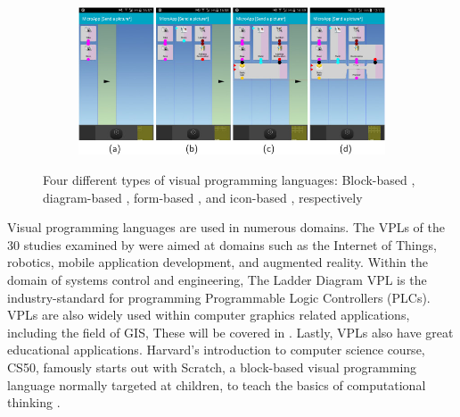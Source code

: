 \begin{figure}
\begin{subfigure}[c]{0.45\linewidth}
  \caption{}\label{fig:vpl-types:3}
\end{subfigure}%
\qquad %
\begin{subfigure}[d]{0.45\linewidth}
  \centering
  \graphicspath{{../../assets/images/background/vpl/}}
  \includegraphics[width=\linewidth]{icon-based.jpg}
  \caption{}\label{fig:vpl-types:4}
\end{subfigure}%
\caption[Types of \ac{vpl}s]{Four different types of visual programming languages: 
Block-based \citep{resnick_scratch_2009}, 
diagram-based \citep{blender_foundation_geometry_2022}, 
form-based \citep{weber_form-based_2013}, 
and icon-based \citep{francese_iconic_2017}, respectively}%
\label{fig:vpl-types}
\end{figure}

Visual programming languages are used in numerous domains. 
The VPLs of the 30 studies examined by \citet{kuhail_characterizing_2021} were aimed at domains such as the Internet of Things, robotics, mobile application development, and augmented reality. 
Within the domain of systems control and engineering, The Ladder Diagram VPL \citep{control_automation_ladder_2018} is the industry-standard for programming Programmable Logic Controllers (PLCs).
\ac{VPL}s are also widely used within computer graphics related applications, including the field of \ac{GIS}, 
These will be covered in .
Lastly, \ac{VPL}s also have great educational applications. 
Harvard's introduction to computer science course, CS50, famously starts out with Scratch, a block-based visual programming language normally targeted at children, to teach the basics of computational thinking \citep{yu_cs50s_2021}. 

 

